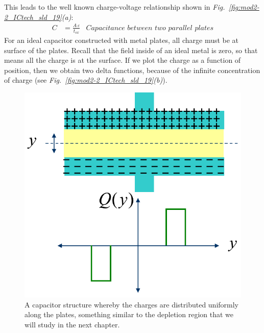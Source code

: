 This leads to the well known charge-voltage relationship shown in \emph{Fig.~\ref{fig:mod2-2_ICtech_sld_19}(a)}:
    \begin{align} 
        C &= \frac{A\,\varepsilon}{t_{ox}} &\textit{Capacitance between two parallel plates}
    \end{align}
For an ideal capacitor constructed with metal plates, all charge must be at surface of the plates.  Recall that the field inside of an ideal metal is zero, so that means all the charge is at the surface.  If we plot the charge as a function of position, then we obtain two delta functions, because of the infinite concentration of charge \big(see \emph{Fig.~\ref{fig:mod2-2_ICtech_sld_19}(b)}\big).
\begin{figure}[H]
\centering
\includegraphics[width=.5\columnwidth]{mod2-2_ICtech_sld_20b} 
\caption{A capacitor structure whereby the charges are distributed uniformly along the plates, something similar to the depletion region that we will study in the next chapter.}
\label{fig:mod2-2_ICtech_sld_20b}
\end{figure}
